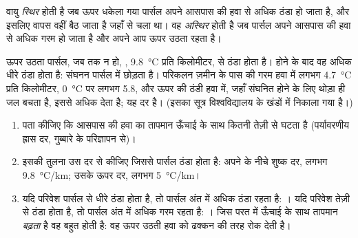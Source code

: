 \begin{definition}[स्थिर वायु; अस्थिर वायु]\label{def:g10:why-clouds-form:stability}
वायु \emph{स्थिर} होती है जब ऊपर धकेला गया पार्सल अपने आसपास की हवा से
अधिक ठंडा हो जाता है, और इसलिए वापस वहीं बैठ जाता है जहाँ से चला था। वह
\emph{अस्थिर} होती है जब पार्सल अपने आसपास की हवा से अधिक गरम हो
जाता है और अपने आप ऊपर उठता रहता है।
\end{definition}

ऊपर उठता पार्सल, जब तक  न हो, , \qty{9.8}{\degreeCelsius}
प्रति किलोमीटर, से ठंडा होता है।  होने के बाद वह
अधिक धीरे ठंडा होता है: संघनन पार्सल में  छोड़ता है। परिकलन
ज़मीन के पास की गरम हवा में लगभग \qty{4.7}{\degreeCelsius} प्रति किलोमीटर,
\qty{0}{\degreeCelsius} पर लगभग \num{5.8}, और ऊपर की ठंडी हवा में, जहाँ संघनित
होने के लिए थोड़ा ही जल बचता है, इससे अधिक देता है; यह
 दर है। (इसका सूत्र विश्वविद्यालय के खंडों में निकाला गया है।)

\begin{method}[क्या यह वायु स्थिर है?]\label{met:g10:why-clouds-form:stable}
\begin{enumerate}
  \item पता कीजिए कि आसपास की हवा का तापमान ऊँचाई के साथ कितनी तेज़ी से घटता है
        (पर्यावरणीय ह्रास दर, गुब्बारे के परिज्ञापन से)।
  \item इसकी तुलना उस दर से कीजिए जिससे पार्सल ठंडा होता है: अपने  के नीचे
        शुष्क दर, लगभग \qty{9.8}{\degreeCelsius/km};
        उसके ऊपर  दर, लगभग \qty{5}{\degreeCelsius/km}।
  \item यदि परिवेश पार्सल से धीरे ठंडा होता है, तो पार्सल अंत में
        अधिक ठंडा रहता है: । यदि परिवेश तेज़ी से ठंडा होता है, तो पार्सल अंत में
        अधिक गरम रहता है: । जिस परत में ऊँचाई के साथ तापमान \emph{बढ़ता} है वह
        बहुत  होती है: वह ऊपर उठती हवा को ढक्कन की तरह रोक देती है।
\end{enumerate}
\end{method}

